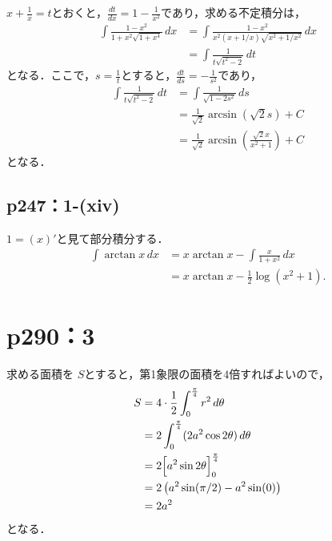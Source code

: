 \begin{tanswer}
    $x+\frac{1}{x}=t$とおくと，$\frac{dt}{dx}=1-\frac{1}{x^2}$であり，求める不定積分は，
    \begin{align*}
        \int \frac{1-x^2}{1+x^2\sqrt{1+x^4}} \, dx & = \int \frac{1-x^2}{x^2 (x+1/x)\sqrt{x^2 + 1/x^2}} \, dx \\
                                                   & =\int \frac{1}{t\sqrt{t^2-2}} \, dt
    \end{align*}
    となる．ここで，$s=\frac{1}{t}$とすると，$\frac{dt}{ds}=-\frac{1}{s^2}$であり，
    \begin{align*}
        \int \frac{1}{t \sqrt{t^2-2}} \, dt & = \int \frac{1}{\sqrt{1-2s^2}} \, ds                                 \\
                                            & = \frac{1}{\sqrt{2}} \arcsin (\sqrt{2}s)+C                           \\
                                            & = \frac{1}{\sqrt{2}} \arcsin \left(\frac{\sqrt{2}x}{x^2+1} \right)+C
    \end{align*}
    となる．
\end{tanswer}

\subsection*{p247：1-(xiv)}


\begin{tanswer}
    $1 = (x)'$と見て部分積分する．
    \begin{align*}
        \int \arctan x \,dx
         & = x \arctan x - \int \frac{x}{1+x^2} \,dx \\
         & = x \arctan x - \frac{1}{2} \log (x^2+1).
    \end{align*}
\end{tanswer}




\section*{p290：3}

\begin{tanswer}
    求める面積を $S$とすると，第1象限の面積を$4$倍すればよいので，
    \begin{align*}
        S & =4 \cdot  \frac{1}{2}\int_{0}^{\frac{\pi}{4}} r^2 \, d \theta \\
          & = 2 \int_{0}^{\frac{\pi}{4}} (2a^2 \cos 2\theta) \, d \theta  \\
          & =2\Bigl [ a^2 \sin 2\theta \Bigl ]_{0}^{\frac{\pi}{4}}        \\
          & = 2\left ( a^2 \sin (\pi/2)-a^2 \sin (0) \right)              \\
          & = 2a^2
    \end{align*}
    となる．
\end{tanswer}

